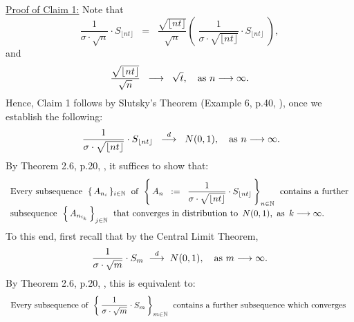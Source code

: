 \begin{enumerate}
		\vskip 0.5cm
		\noindent
		\underline{Proof of Claim 1:}\quad
		Note that
		\begin{equation*}
		\dfrac{1}{\sigma\cdot\sqrt{n}} \cdot S_{\lfloor nt \rfloor}
		\;\; = \;\;
		\dfrac{\sqrt{\lfloor nt \rfloor}}{\sqrt{n}} \left(\;\dfrac{1}{\sigma\cdot\sqrt{\lfloor nt \rfloor}} \cdot S_{\lfloor nt \rfloor}\;\right),
		\end{equation*}
		and
		\begin{equation*}
		\dfrac{\sqrt{\lfloor nt \rfloor}}{\sqrt{n}}
		\;\; \longrightarrow \;\; \sqrt{t},
		\quad
		\textnormal{as $n \longrightarrow \infty$}.
		\end{equation*}
		Hence, Claim 1 follows by Slutsky's Theorem (Example 6, p.40, \cite{Ferguson1996}),
		once we establish the following:
		\begin{equation*}
		\;\dfrac{1}{\sigma\cdot\sqrt{\lfloor nt \rfloor}} \cdot S_{\lfloor nt \rfloor}
		\;\; \overset{d}{\longrightarrow} \;\; N(0,1),
		\quad
		\textnormal{as $n \longrightarrow \infty$}.
		\end{equation*}
		By Theorem 2.6, p.20, \cite{Billingsley1999}, it suffices to show that:
		\begin{equation}\label{ClaimOneSubsequence}
		\begin{array}{l}
		\textnormal{Every subsequence \;$\{\,A_{n_{i}}\,\}_{i\in\mathbb{N}}$\; of
		\;$\left\{\,A_{n} \;\; := \;\; \dfrac{1}{\sigma\cdot\sqrt{\lfloor nt \rfloor}} \cdot S_{\lfloor nt \rfloor}\,\right\}_{n \in \mathbb{N}}$\;
		contains a further}
		\\
		\textnormal{subsequence \;$\left\{\,A_{n_{i_{k}}}\,\right\}_{j\in\mathbb{N}}$\;
		that converges in distribution to \,$N(0,1)$,\, as \,$k \longrightarrow \infty$.}
		\end{array}
		\end{equation}
		To this end, first recall that by the Central Limit Theorem,
		\begin{equation*}
		\dfrac{1}{\sigma\cdot\sqrt{m}}\cdot S_{m}
		\;\overset{d}{\longrightarrow}\;
		N(0,1),
		\quad
		\textnormal{as $m \longrightarrow \infty$}.
		\end{equation*}
		By Theorem 2.6, p.20, \cite{Billingsley1999}, this is equivalent to:
		\begin{equation}\label{CLTsubsequence}
		\begin{array}{l}
		\textnormal{Every
			subsequence of \;$\left\{\,\dfrac{1}{\sigma\cdot\sqrt{m}}\cdot S_{m}\,\right\}_{m\in\mathbb{N}}$\;
			contains a further subsequence which converges
			}
			\\

\end{array}
\end{equation}
\end{enumerate}
